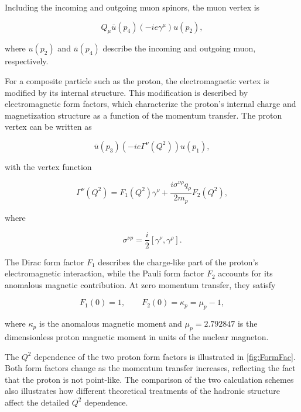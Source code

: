 Including the incoming and outgoing muon spinors, the muon vertex is

\[
Q_\mu
\overline{u}(p_4)
(-ie\gamma^\mu)
u(p_2),
\]

where \(u(p_2)\) and \(\overline{u}(p_4)\) describe the incoming and outgoing muon, respectively.

For a composite particle such as the proton, the electromagnetic vertex is modified by its internal structure. This modification is described by electromagnetic form factors, which characterize the proton's internal charge and magnetization structure as a function of the momentum transfer. The proton vertex can be written as

\[
\overline{u}(p_3)
(-ie\Gamma^\nu(Q^2))
u(p_1),
\]

with the vertex function

\begin{equation}
\Gamma^\nu(Q^2)
=
F_1(Q^2)\gamma^\nu
+
\frac{i\sigma^{\nu\rho}q_\rho}{2m_p}
F_2(Q^2),
\label{eq:proton_vertex}
\end{equation}

where

\[
\sigma^{\nu\rho}
=
\frac{i}{2}
[\gamma^\nu,\gamma^\rho].
\]

The Dirac form factor \(F_1\) describes the charge-like part of the proton's electromagnetic interaction, while the Pauli form factor \(F_2\) accounts for its anomalous magnetic contribution. At zero momentum transfer, they satisfy

\[
F_1(0)=1,
\qquad
F_2(0)=\kappa_p=\mu_p-1,
\]

where \(\kappa_p\) is the anomalous magnetic moment and
\(\mu_p=2.792847\) is the dimensionless proton magnetic moment in units of the nuclear magneton.

The \(Q^2\) dependence of the two proton form factors is illustrated in \autoref{fig:FormFac}. Both form factors change as the momentum transfer increases, reflecting the fact that the proton is not point-like. The comparison of the two calculation schemes also illustrates how different theoretical treatments of the hadronic structure affect the detailed \(Q^2\) dependence.

